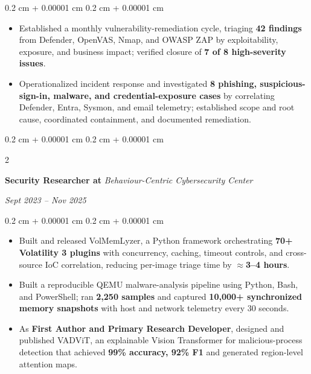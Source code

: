 \documentclass[11pt, letterpaper]{article}
\newenvironment{highlights}{
    \begin{itemize}[
        topsep=0.02 cm,
        parsep=0.02 cm,
        partopsep=0pt,
        itemsep=0pt,
        leftmargin=0.4 cm + 10pt
    ]
}{
    \end{itemize}
} %
\newenvironment{onecolentry}{
    \begin{adjustwidth}{
        0.2 cm + 0.00001 cm
    }{
        0.2 cm + 0.00001 cm
    }
}{
    \end{adjustwidth}
} %
\newenvironment{twocolentry}[2][]{
    \onecolentry
    \def\secondColumn{#2}
    \setcolumnwidth{\fill, 4.5 cm}
    \begin{paracol}{2}
}{
    \switchcolumn \raggedleft \secondColumn
    \end{paracol}
    \endonecolentry
} %
\let\hrefWithoutArrow\href
\renewcommand{\href}[2]{\hrefWithoutArrow{#1}{\ifthenelse{\equal{#2}{}}{ }{#2}}}
\begin{document}
\begin{onecolentry}
\begin{highlights}
        \item Established a monthly vulnerability-remediation cycle, triaging \textbf{42 findings} from Defender, OpenVAS, Nmap, and OWASP ZAP by exploitability, exposure, and business impact; verified closure of \textbf{7 of 8 high-severity issues}.
        \vspace{0.085cm}

        \item Operationalized incident response and investigated \textbf{8 phishing, suspicious-sign-in, malware, and credential-exposure cases} by correlating Defender, Entra, Sysmon, and email telemetry; established scope and root cause, coordinated containment, and documented remediation.


    \end{highlights}
\end{onecolentry}

    \vspace{0.15cm}
    \begin{twocolentry}{
        \textit{Sept 2023 -- Nov 2025}}
        \textbf{Security Researcher at }
        \textit{Behaviour-Centric Cybersecurity Center \href{https://www.yorku.ca/research/bccc/}{(BCCC)}}
    \end{twocolentry}

    \begin{onecolentry}
    \begin{highlights}


        \item Built and released VolMemLyzer, a Python framework orchestrating \textbf{70+ Volatility 3 plugins} with concurrency, caching, timeout controls, and cross-source IoC correlation, reducing per-image triage time by $\approx$\textbf{3--4 hours}. \
        \vspace{0.085cm}


        \item Built a reproducible QEMU malware-analysis pipeline using Python, Bash, and PowerShell; ran \textbf{2,250 samples} and captured \textbf{10,000+ synchronized memory snapshots} with host and network telemetry every 30 seconds.
        \vspace{0.085cm}

        \item As \textbf{First Author and Primary Research Developer}, designed and published VADViT, an explainable Vision Transformer for malicious-process detection that achieved \textbf{99\% accuracy, 92\% F1} and generated region-level attention maps.


    \end{highlights}
    \end{onecolentry}
\end{document}
